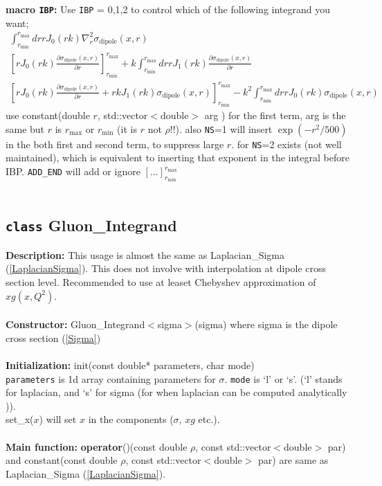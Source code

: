 \documentclass[12pt]{article}
\newenvironment{entry}[1]{\textbf{\large #1:  }}{\\\vspace{3mm}\\}
\begin{document}
\begin{entry}{macro \texttt{IBP}}
	Use \texttt{IBP} = 0,1,2 to control which of the following integrand you want; 
	\begin{align}
		\int^{r_{\mathrm{max}}}_{r_{\mathrm{min}}} dr r J_0(rk)\nabla^2_{r}\sigma_{\mathrm{dipole}}(x,r)\\
		\left[ r J_0(rk)\frac{\partial\sigma_{\mathrm{dipole}}(x,r)}{\partial r}\right]^{r_{\mathrm{max}}}_{r_{\mathrm{min}}}
		+k\int^{r_{\mathrm{max}}}_{r_{\mathrm{min}}} dr r J_1(rk)\frac{\partial\sigma_{\mathrm{dipole}}(x,r)}{\partial r}\\
			\left[ r J_0(rk)\frac{\partial\sigma_{\mathrm{dipole}}(x,r)}{\partial r}+
			rk J_1(rk)\sigma_{\mathrm{dipole}}(x,r)
			 \right]^{r_{\mathrm{max}}}_{r_{\mathrm{min}}}
			-k^2\int^{r_{\mathrm{max}}}_{r_{\mathrm{min}}} dr r J_0(rk)\sigma_{\mathrm{dipole}}(x,r)
	\end{align}
	use constant(double $r$, std::vector$<$double$>$ arg ) for the first term, arg is the same but $r$ is $r_{\mathrm{max}}$ or $r_{\mathrm{min}}$ (it is $r$ not $\rho$!!). 
	also \texttt{NS}=1 will insert $\exp(-r^2/500)$ in the both first and second term, to suppress large $r$. 
	for \texttt{NS}=2 exists (not well maintained), which is  equivalent to inserting that exponent in the integral before IBP.
	\texttt{ADD\_END} will add or ignore $[...]^{r_{\mathrm{max}}}_{r_{\mathrm{min}}}$
\end{entry}
\subsection{\texttt{class} Gluon\_Integrand}\label{GluonIntegrand}
\begin{entry}{Description}
This usage is almost the same as Laplacian\_Sigma (\ref{LaplacianSigma}). 
This does not involve with interpolation at dipole cross section level. Recommended to use at leaset Chebyshev approximation of $xg(x,Q^2)$.
\end{entry}
\begin{entry}{Constructor}
 Gluon\_Integrand$<$sigma$>$(sigma)
	where sigma is the dipole cross section (\ref{Sigma})
\end{entry}
\begin{entry}{Initialization}
	init(const double* parameters, char mode)\\
	\texttt{parameters} is 1d array containing parameters for $\sigma$. \texttt{mode} is `l' or `s'.  (`l' stands for laplacian, and `s' for sigma (for when laplacian can be computed analytically )). \\
	set\_x($x$) will set $x$ in the components ($\sigma$, $xg$ etc.).
\end{entry}
\begin{entry}{Main function}
	\textbf{operator}()(const double $\rho$, const std::vector$<$double$>$ par) and 
	constant(const double $\rho$, const std::vector$<$double$>$ par)
	are same as Laplacian\_Sigma (\ref{LaplacianSigma}).
\end{entry}
\end{document}
